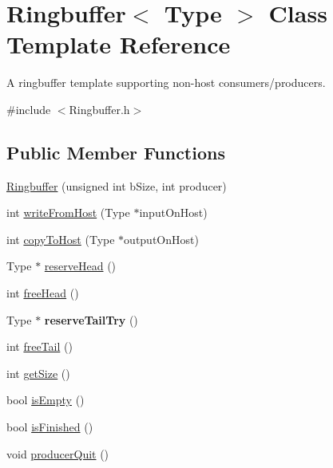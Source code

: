 \hypertarget{classRingbuffer}{\section{Ringbuffer$<$ Type $>$ Class Template Reference}
\label{classRingbuffer}
}


A ringbuffer template supporting non-\/host consumers/producers.  




{\ttfamily \#include $<$Ringbuffer.\-h$>$}

\subsection*{Public Member Functions}
\begin{DoxyCompactItemize}
\item 
\hyperlink{classRingbuffer_ae2ff732b1a9a88f95d57ce27330c00ad}{Ringbuffer} (unsigned int b\-Size, int producer)
\item 
int \hyperlink{classRingbuffer_ac8b2973f3ab190cf778535c394ba980d}{write\-From\-Host} (Type $\ast$input\-On\-Host)
\item 
int \hyperlink{classRingbuffer_a97f008c10065843bbab49579c8ce3ce4}{copy\-To\-Host} (Type $\ast$output\-On\-Host)
\item 
Type $\ast$ \hyperlink{classRingbuffer_acf64a0c3c16f208dd1191130b0d18b33}{reserve\-Head} ()
\item 
int \hyperlink{classRingbuffer_a1d8b62be3d51a00930e7b06d1ad2df53}{free\-Head} ()
\item 
\hypertarget{classRingbuffer_ab8a0b4877bfcf06687d782b029185be7}{Type $\ast$ {\bfseries reserve\-Tail\-Try} ()}\label{classRingbuffer_ab8a0b4877bfcf06687d782b029185be7}

\item 
int \hyperlink{classRingbuffer_a66193754bca336ed8b8f2d5a9a89995c}{free\-Tail} ()
\item 
int \hyperlink{classRingbuffer_aefca234ed766de811794f6ab91e86d17}{get\-Size} ()
\item 
bool \hyperlink{classRingbuffer_af746d95cfff3115957d01181484be191}{is\-Empty} ()
\item 
bool \hyperlink{classRingbuffer_ac43a1bbfa6c41dd0aba33c70248425a6}{is\-Finished} ()
\item 
void \hyperlink{classRingbuffer_ae40e43d8729f0cfdcb97675cda52b05f}{producer\-Quit} ()
\end{DoxyCompactItemize}


